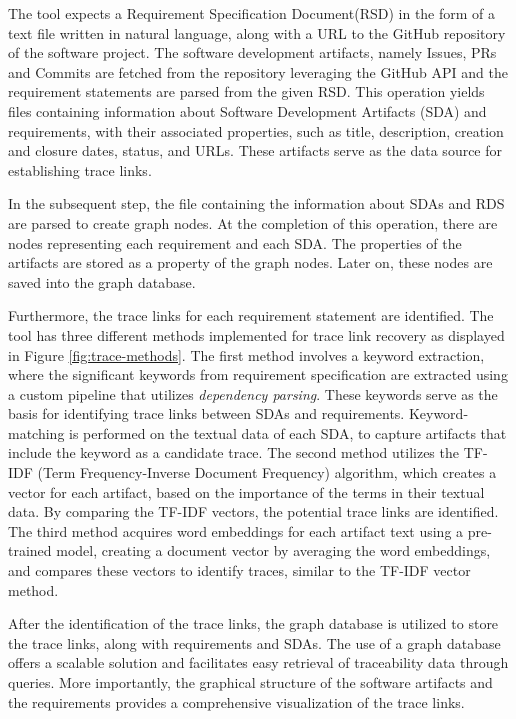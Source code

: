 The tool expects a Requirement Specification Document(RSD) in the form of a text file written in natural language, along with a URL to the GitHub repository of the software project. The software development artifacts, namely Issues, PRs and Commits are fetched from the repository leveraging the GitHub API
and the requirement statements are parsed from the given RSD. This operation yields files containing information about Software Development Artifacts (SDA) and requirements, with their associated properties, such as title, description, creation and closure dates, status, and URLs. These artifacts serve as the data source for establishing trace links.

In the subsequent step, the file containing the information about SDAs and RDS are parsed to create graph nodes. At the completion of this operation, there are nodes representing each requirement and each SDA. The properties of the artifacts are stored as a property of the graph nodes. Later on, these nodes are saved into the graph database.

Furthermore, the trace links for each requirement statement are identified. The tool has three different methods implemented for trace link recovery as displayed in Figure \ref{fig:trace-methods}. The first method involves a keyword extraction, where the significant keywords from requirement specification are extracted using a custom pipeline that utilizes \textit{dependency parsing}. These keywords serve as the basis for identifying trace links between SDAs and requirements. Keyword-matching is performed on the textual data of each SDA, to capture artifacts that include the keyword as a candidate trace. The second method utilizes the TF-IDF (Term Frequency-Inverse Document Frequency) algorithm, which creates a vector for each artifact, based on the importance of the terms in their textual data. By comparing the TF-IDF vectors, the potential trace links are identified. The third method acquires word embeddings for each artifact text using a pre-trained model, creating a document vector by averaging the word embeddings, and compares these vectors to identify traces, similar to the TF-IDF vector method.

After the identification of the trace links, the graph database is utilized to store the trace links, along with requirements and SDAs. The use of a graph database offers a scalable solution and facilitates easy retrieval of traceability data through queries. More importantly, the graphical structure of the software artifacts and the requirements provides a comprehensive visualization of the trace links.

